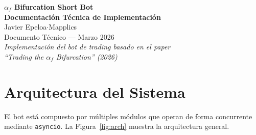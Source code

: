 \documentclass[11pt,a4paper]{article}
\newcommand{\af}{\alpha_f}
\newcommand{\code}[1]{\texttt{\small #1}}
\begin{document}
\begin{center}
    {\LARGE\bfseries $\af$ Bifurcation Short Bot}\\[6pt]
    {\LARGE\bfseries Documentaci\'on T\'ecnica de Implementaci\'on}\\[16pt]
    {\large Javier Epeloa\quad$\cdot$\quad Mapplics}\\[8pt]
    {\normalsize Documento T\'ecnico --- Marzo 2026}\\[4pt]
    {\small\itshape Implementaci\'on del bot de trading basado en el paper\\
    ``Trading the $\af$ Bifurcation'' (2026)}
\end{center}

\vspace{12pt}

\begin{abstract}
Este documento describe la implementaci\'on completa del bot de trading
$\af$ Bifurcation Short, un sistema automatizado para operar en el mercado
de futuros perpetuos de Binance. El sistema graba datos de mercado en
tiempo real (WebSocket + REST), calcula un score compuesto de 5 componentes
que detecta la inversi\'on del spring $\af < 0$, acumula energ\'ia temporal,
detecta se\~nales de agotamiento (exhaustion) y ejecuta entradas short con
4 variantes simult\'aneas. Se documenta la arquitectura del sistema, los
flujos de datos, la l\'ogica de decisi\'on de entrada/salida, el sistema
adaptativo de par\'ametros de salida (AEPS) y la evoluci\'on del sistema
desde v1 hasta v4. Se presenta validaci\'on estad\'istica formal sobre
$N=30$ trades reales, demostrando bimodalidad significativa ($p < 0.001$)
en la se\~nal de entrada y verificaci\'on emp\'irica post-stop-loss.
\end{abstract}

\tableofcontents
\newpage

\section{Arquitectura del Sistema}
\label{sec:architecture}

El bot est\'a compuesto por m\'ultiples m\'odulos que operan de forma
concurrente mediante \code{asyncio}. La Figura~\ref{fig:arch} muestra
la arquitectura general.
\end{document}
